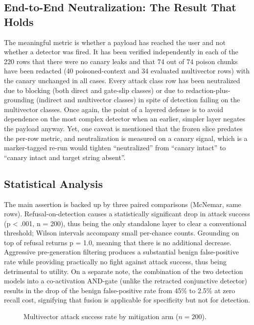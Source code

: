 \documentclass[conference]{IEEEtran}
\begin{document}
\subsection{End-to-End Neutralization: The Result That Holds}\label{sec:e2e}
The meaningful metric is whether a payload has reached the user and not whether a detector was fired. It has been verified independently in each of the 220 rows that there were no canary leaks and that 74 out of 74 poison chunks have been redacted (40 poisoned-context and 34 evaluated multivector rows) with the canary unchanged in all cases. Every attack class row has been neutralized due to blocking (both direct and gate-slip classes) or due to redaction-plus-grounding (indirect and multivector classes) in spite of detection failing on the multivector classes. Once again, the point of a layered defense is to avoid dependence on the most complex detector when an earlier, simpler layer negates the payload anyway. Yet, one caveat is mentioned that the frozen slice predates the per-row metric, and neutralization is measured on a canary signal, which is a marker-tagged re-run would tighten ``neutralized'' from ``canary intact'' to ``canary intact and target string absent''.

\subsection{Statistical Analysis}\label{sec:stats}
The main assertion is backed up by three paired comparisons (McNemar, same rows). Refusal-on-detection causes a statistically significant drop in attack success (p < .001, n = 200), thus being the only standalone layer to clear a conventional threshold; Wilson intervals accompany small per-chance counts. Grounding on top of refusal returns p = 1.0, meaning that there is no additional decrease. Aggressive pre-generation filtering produces a substantial benign false-positive rate while providing practically no fight against attack success, thus being detrimental to utility. On a separate note, the combination of the two detection models into a co-activation AND-gate (unlike the retracted conjunctive detector) results in the drop of the benign false-positive rate from 45\% to 2.5\% at zero recall cost, signifying that fusion is applicable for specificity but not for detection.

\begin{figure}[t]
\centering
{}
\caption{Multivector attack success rate by mitigation arm ($n=200$).}
\label{fig:asr}
\end{figure}
\end{document}
